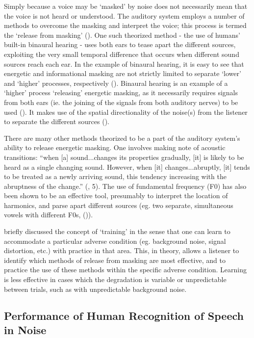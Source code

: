 Simply because a voice may be `masked' by noise does not necessarily mean that the voice is not heard or understood.  The auditory system employs a number of methods to overcome the masking and interpret the voice; this process is termed the `release from masking' (\cite{middlebrooks:17}).  One such theorized method - the use of humans' built-in binaural hearing - uses both ears to tease apart the different sources, exploiting the very small temporal difference that occurs when different sound sources reach each ear.  
In the example of binaural hearing, it is easy to see that energetic and informational masking are not strictly limited to separate `lower' and `higher' processes, respectively (\cite{durlach:06}).
Binaural hearing is an example of a `higher' process `releasing' energetic masking, as it necessarily requires signals from both ears (ie. the joining of the signals from both auditory nerves) to be used (\cite{hirsh:48}). It makes use of the spatial directionality of the noise(s) from the listener to separate the different sources (\cite{bregman:94}).

There are many other methods theorized to be a part of the auditory system's ability to release energetic masking.  One involves making note of acoustic transitions: ``when [a] sound...changes its properties gradually, [it] is likely to be heard as a single changing sound.  However, when [it] changes...abruptly, [it] tends to be treated as a newly arriving sound, this tendency increasing with the abruptness of the change.'' (\cite{bregman:94}, 5).  The use of fundamental frequency (F0) has also been shown to be an effective tool, presumably to interpret the location of harmonics, and parse apart different sources (eg. two separate, simultaneous vowels with different F0s, (\cite{bird:97})). %

\cite{mattys:12} briefly discussed the concept of `training' in the sense that one can learn to accommodate a particular adverse condition (eg. background noise, signal distortion, etc.) with practice in that area.  This, in theory, allows a listener to identify which methods of release from masking are most effective, and to practice the use of these methods within the specific adverse condition.  Learning is less effective in cases which the degradation is variable or unpredictable between trials, such as with unpredictable background noise.


\subsection{Performance of Human Recognition of Speech in Noise}

